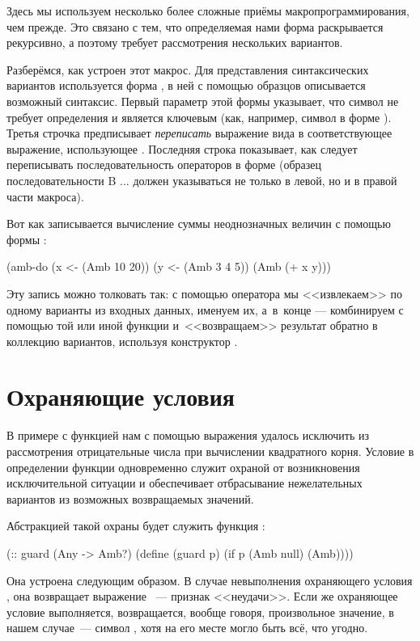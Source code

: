 Здесь мы используем несколько более сложные приёмы макропрограммирования, чем прежде. Это связано с тем, что определяемая нами форма раскрывается рекурсивно, а поэтому требует рассмотрения нескольких вариантов. 

Разберёмся, как устроен этот макрос. Для представления синтаксических вариантов используется форма , в ней с помощью образцов описывается возможный синтаксис. Первый параметр этой формы \s{(<-)} указывает, что символ \s{<-} не требует определения и является ключевым (как, например, символ  в форме ).
Третья строчка предписывает \emph{переписать} выражение вида  в соответствующее выражение, использующее . Последняя строка показывает, как следует переписывать последовательность операторов в форме  (образец последовательности {\schemestyle B ...} должен указываться не только в левой, но и в правой части макроса).

Вот как записывается вычисление суммы неоднозначных величин с помощью формы :
\begin{SchemeCode}
(amb-do (x <- (Amb 10 20))
    (y <- (Amb 3 4 5)) 
    (Amb (+ x y)))
\end{SchemeCode}

Эту запись можно толковать так: с помощью оператора \s{<-} мы <<извлекаем>> по одному варианты из входных данных, именуем их, а~в~конце --- комбинируем с помощью той или иной функции и~<<возвращаем>> результат обратно в коллекцию вариантов, используя конструктор .

\section[2]{Охраняющие условия}%
В примере с функцией  нам с помощью выражения  удалось исключить из рассмотрения отрицательные числа при вычислении квадратного корня. Условие в определении функции  одновременно служит охраной от возникновения исключительной ситуации и обеспечивает отбрасывание нежелательных вариантов из возможных возвращаемых значений.

Абстракцией такой охраны будет служить функция :

\begin{Definition}[emph={p}]
(:: guard (Any -> Amb?)
  (define (guard p)
    (if p (Amb null) (Amb))))
\end{Definition}

Она устроена следующим образом. В случае невыполнения охраняющего условия , она возвращает  выражение ~--- признак <<неудачи>>. Если же охраняющее условие выполняется, возвращается, вообще говоря, произвольное значение, в нашем случае~--- символ , хотя на его месте могло быть всё, что угодно.

